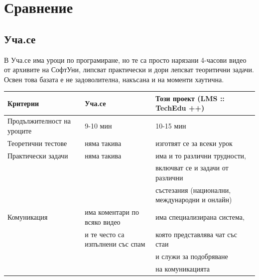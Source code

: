 \documentclass[12pt]{article}
\begin{document}
	\section{Сравнение}
	\subsection{Уча.се}
	В Уча.се има уроци по програмиране, но те са просто нарязани 4-часови видео от архивите на СофтУни, липсват практически и дори лепсват теоритични задачи. Освен това базата е не задоволителна, накъсана и на моменти хаутична.
	\begin{table}[ht]
		\centering
		\resizebox{\textwidth}{!}
		{
			\begin{tabular}{l|l|l}
				Критерии & Уча.се & Този проект (LMS :: TechEdu ++)\\
				\hline
				Продължителност на уроците & 9-10 мин & 10-15 мин \\
				\hline
				Теоретични тестове & няма такива & изготвят се за всеки урок\\
				\hline
				Практически задачи & няма такива & има и то различни трудности,\\
				& & включват се и задачи от различни \\
				& & състезания (национални, международни и онлайн)\\
				\hline
				Комуникация & има коментари по всяко видео & има специализирана система,\\
				& и те често са изпълнени със спам & която представлява чат със стаи \\
				& & и служи за подобряване\\
				& & на комуникацията\\
				\hline
			\end{tabular}
		}
	\end{table}\\
\end{document}
